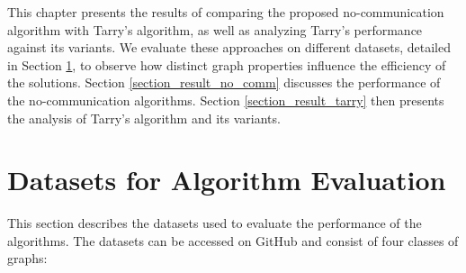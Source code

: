 This chapter presents the results of comparing the proposed no-communication algorithm with Tarry's algorithm, as well as analyzing Tarry's performance against its variants. We evaluate these approaches on different datasets, detailed in Section \ref{section_datasets}, to observe how distinct graph properties influence the efficiency of the solutions. Section \ref{section_result_no_comm} discusses the performance of the no-communication algorithms. Section \ref{section_result_tarry} then presents the analysis of Tarry's algorithm and its variants.

\section{Datasets for Algorithm Evaluation} 
\label{section_datasets}

This section describes the datasets used to evaluate the performance of the algorithms. The datasets can be accessed on GitHub \cite{DiPiero2024} and consist of four classes of graphs:

